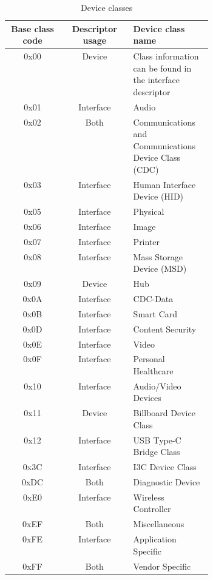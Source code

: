 \begin{table}[ht]
    \centering
    \begin{tabular}{|c|c|p{0.39\linewidth}|} \hline
         \textbf{Base class code} & \textbf{Descriptor usage} & \textbf{Device class name} \\ \hline
         0x00 & Device      & Class information can be found in the interface descriptor \\ \hline
         0x01 & Interface   & Audio \\ \hline
         0x02 & Both        & Communications and Communications Device Class (CDC) \\ \hline
         0x03 & Interface   & Human Interface Device (HID) \\ \hline
         0x05 & Interface   & Physical \\ \hline
         0x06 & Interface   & Image \\ \hline
         0x07 & Interface   & Printer \\ \hline
         0x08 & Interface   & Mass Storage Device (MSD) \\ \hline
         0x09 & Device      & Hub \\ \hline
         0x0A & Interface   & CDC-Data \\ \hline
         0x0B & Interface   & Smart Card \\ \hline
         0x0D & Interface   & Content Security \\ \hline
         0x0E & Interface   & Video \\ \hline
         0x0F & Interface   & Personal Healthcare \\ \hline
         0x10 & Interface   & Audio/Video Devices \\ \hline
         0x11 & Device      & Billboard Device Class \\ \hline
         0x12 & Interface   & USB Type-C Bridge Class \\ \hline
         0x3C & Interface   & I3C Device Class \\ \hline
         0xDC & Both        & Diagnostic Device \\ \hline
         0xE0 & Interface   & Wireless Controller \\ \hline
         0xEF & Both        & Miscellaneous \\ \hline
         0xFE & Interface   & Application Specific \\ \hline
         0xFF & Both        & Vendor Specific \\ \hline
    \end{tabular}
    \caption{Device classes}
    \label{tab:device_class}
\end{table}

